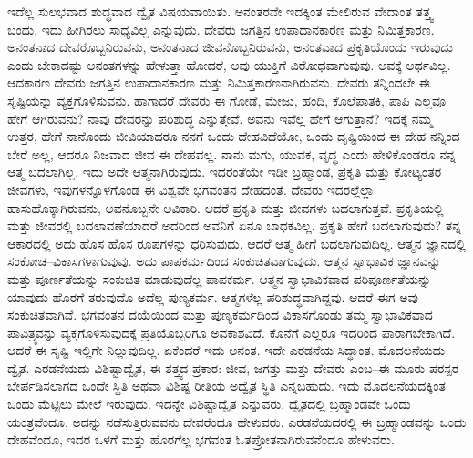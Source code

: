 ಇದೆಲ್ಲ ಸುಲಭವಾದ ಶುದ್ಧವಾದ ದ್ವೈತ ವಿಷಯವಾಯಿತು. ಅನಂತರವೇ ಇದಕ್ಕಿಂತ ಮೇಲಿರುವ ವೇದಾಂತ ತತ್ತ್ವ ಬಂದು, ಇದು ಹೀಗಿರಲು ಸಾಧ್ಯವಿಲ್ಲ ಎನ್ನುವುದು. ದೇವರು ಜಗತ್ತಿನ ಉಪಾದಾನಕಾರಣ ಮತ್ತು ನಿಮಿತ್ತಕಾರಣ. ಅನಂತನಾದ ದೇವರೊಬ್ಬನಿರುವನು, ಅನಂತನಾದ ಜೀವನೊಬ್ಬನಿರುವನು, ಅನಂತವಾದ ಪ್ರಕೃತಿಯೊಂದು ಇರುವುದು ಎಂದು ಬೇಕಾದಷ್ಟು ಅನಂತಗಳನ್ನು ಹೇಳುತ್ತಾ ಹೋದರೆ, ಅವು ಯುಕ್ತಿಗೆ ವಿರೋಧವಾಗುವುವು. ಅವಕ್ಕೆ ಅರ್ಥವಿಲ್ಲ. ಆದಕಾರಣ ದೇವರು ಜಗತ್ತಿನ ಉಪಾದಾನಕಾರಣ ಮತ್ತು ನಿಮಿತ್ತಕಾರಣನಾಗಿರುವನು. ದೇವರು ತನ್ನಿಂದಲೇ ಈ ಸೃಷ್ಟಿಯನ್ನು ವ್ಯಕ್ತಗೊಳಿಸುವನು. ಹಾಗಾದರೆ ದೇವರು ಈ ಗೋಡೆ, ಮೇಜು, ಹಂದಿ, ಕೊಲೆಪಾತಕಿ, ಪಾಪಿ ಎಲ್ಲವೂ ಹೇಗೆ ಆಗಿರುವನು? ನಾವು ದೇವರನ್ನು ಪರಿಶುದ್ಧ ಎನ್ನುತ್ತೇವೆ. ಅವನು ಇವೆಲ್ಲ ಹೇಗೆ ಆಗುತ್ತಾನೆ? ಇದಕ್ಕೆ ನಮ್ಮ ಉತ್ತರ, ಹೇಗೆ ನಾನೊಂದು ಜೀವಿಯಾದರೂ ನನಗೆ ಒಂದು ದೇಹವಿದೆಯೋ, ಒಂದು ದೃಷ್ಟಿಯಿಂದ ಈ ದೇಹ ನನ್ನಿಂದ ಬೇರೆ ಅಲ್ಲ, ಆದರೂ ನಿಜವಾದ ಜೀವ ಈ ದೇಹವಲ್ಲ. ನಾನು ಮಗು, ಯುವಕ, ವೃದ್ಧ ಎಂದು ಹೇಳಿಕೊಂಡರೂ ನನ್ನ ಆತ್ಮ ಬದಲಾಗಿಲ್ಲ. ಇದು ಅದೇ ಆತ್ಮನಾಗಿರುವುದು. ಇದರಂತೆಯೇ ಇಡೀ ಬ್ರಹ್ಮಾಂಡ, ಪ್ರಕೃತಿ ಮತ್ತು ಕೋಟ್ಯಂತರ ಜೀವಗಳು, ಇವುಗಳನ್ನೊಳಗೊಂಡ ಈ ವಿಶ್ವವೇ ಭಗವಂತನ ದೇಹದಂತೆ. ದೇವರು ಇದರಲ್ಲೆಲ್ಲಾ ಹಾಸುಹೊಕ್ಕಾಗಿರುವನು, ಅವನೊಬ್ಬನೇ ಅವಿಕಾರಿ. ಆದರೆ ಪ್ರಕೃತಿ ಮತ್ತು ಜೀವಗಳು ಬದಲಾಗುತ್ತವೆ. ಪ್ರಕೃತಿಯಲ್ಲಿ ಮತ್ತು ಜೀವರಲ್ಲಿ ಬದಲಾವಣೆಯಾದರೆ ಅದರಿಂದ ಅವನಿಗೆ ಏನೂ ಬಾಧಕವಿಲ್ಲ. ಪ್ರಕೃತಿ ಹೇಗೆ ಬದಲಾಗುವುದು? ತನ್ನ ಆಕಾರದಲ್ಲಿ ಅದು ಹೊಸ ಹೊಸ ರೂಪಗಳನ್ನು ಧರಿಸುವುದು. ಆದರೆ ಆತ್ಮ ಹೀಗೆ ಬದಲಾಗುವುದಿಲ್ಲ. ಆತ್ಮನ ಜ್ಞಾನದಲ್ಲಿ ಸಂಕೋಚ–ವಿಕಾಸಗಳಾಗುವುವು. ಅದು ಪಾಪಕರ್ಮದಿಂದ ಸಂಕುಚಿತವಾಗುವುದು. ಆತ್ಮನ ಸ್ವಾಭಾವಿಕ ಜ್ಞಾನವನ್ನು ಮತ್ತು ಪೂರ್ಣತೆಯನ್ನು ಸಂಕುಚಿತ ಮಾಡುವುದೆಲ್ಲ ಪಾಪಕರ್ಮ. ಆತ್ಮನ ಸ್ವಾಭಾವಿಕವಾದ ಪರಿಪೂರ್ಣತೆಯನ್ನು ಯಾವುದು ಹೊರಗೆ ತರುವುದೊ ಅದೆಲ್ಲ ಪುಣ್ಯಕರ್ಮ. ಆತ್ಮಗಳೆಲ್ಲ ಪರಿಶುದ್ಧವಾಗಿದ್ದವು. ಆದರೆ ಈಗ ಅವು ಸಂಕುಚಿತವಾಗಿವೆ. ಭಗವಂತನ ದಯೆಯಿಂದ ಮತ್ತು ಪುಣ್ಯಕರ್ಮದಿಂದ ವಿಕಾಸಗೊಂಡು ತಮ್ಮ ಸ್ವಾಭಾವಿಕವಾದ ಪಾವಿತ್ರ್ಯವನ್ನು ವ್ಯಕ್ತಗೊಳಿಸುವುದಕ್ಕೆ ಪ್ರತಿಯೊಬ್ಬರಿಗೂ ಅವಕಾಶವಿದೆ. ಕೊನೆಗೆ ಎಲ್ಲರೂ ಇದರಿಂದ ಪಾರಾಗಬೇಕಾಗಿದೆ. ಆದರೆ ಈ ಸೃಷ್ಟಿ ಇಲ್ಲಿಗೇ ನಿಲ್ಲುವುದಿಲ್ಲ. ಏಕೆಂದರೆ ಇದು ಅನಂತ. ಇದೇ ಎರಡನೆಯ ಸಿದ್ಧಾಂತ. ಮೊದಲನೆಯದು ದ್ವೈತ. ಎರಡನೆಯದು ವಿಶಿಷ್ಟಾದ್ವೈತ, ಈ ತತ್ತ್ವದ ಪ್ರಕಾರ: ಜೀವ, ಜಗತ್ತು ಮತ್ತು ದೇವರು ಎಂಬ–ಈ ಮೂರು ಪರಸ್ಪರ ಬೇರ್ಪಡಿಸಲಾಗದ ಒಂದೇ ಸ್ಥಿತಿ ಅಥವಾ ವಿಶಿಷ್ಟ ರೀತಿಯ ಅದ್ವೈತ ಸ್ಥಿತಿ ಎನ್ನಬಹುದು. ಇದು ಮೊದಲನೆಯದಕ್ಕಿಂತ ಒಂದು ಮೆಟ್ಟಿಲು ಮೇಲೆ ಇರುವುದು. ಇದನ್ನೇ ವಿಶಿಷ್ಟಾದ್ವೈತ ಎನ್ನುವರು. ದ್ವೈತದಲ್ಲಿ ಬ್ರಹ್ಮಾಂಡವೇ ಒಂದು ಯಂತ್ರವೆಂದೂ, ಅದನ್ನು ನಡೆಸುತ್ತಿರುವವನು ದೇವರೆಂದೂ ಹೇಳುವರು. ಎರಡನೆಯದರಲ್ಲಿ ಈ ಬ್ರಹ್ಮಾಂಡವನ್ನು ಒಂದು ದೇಹವೆಂದೂ, ಇದರ ಒಳಗೆ ಮತ್ತು ಹೊರಗೆಲ್ಲ ಭಗವಂತ ಓತಪ್ರೋತನಾಗಿರುವನೆಂದೂ ಹೇಳುವರು.

